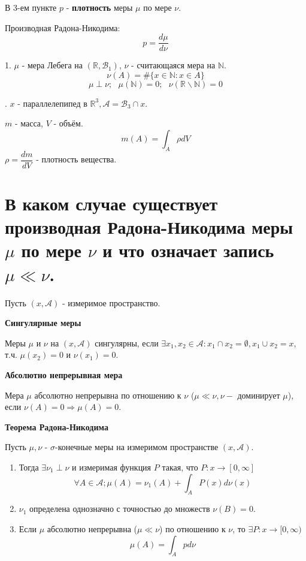 \begin{remark}
	В 3-ем пункте $p$ - \textbf{плотность} меры $\mu$ по мере $\nu$.
	
	Производная Радона-Никодима:
	\[ p = \frac{d \mu}{d \nu} \]
\end{remark}

\begin{exmp}
	1. $\mu$ - мера Лебега на $(\mathbb{R}, \mathcal{B}_1)$, $\nu$ - считающаяся мера на $\mathbb{N}$.
	\[ \nu (A) = \# \{ x \in \mathbb{N} : x \in A \} \]
	\[ \mu \perp \nu; ~~~ \mu (\mathbb{N}) = 0; ~~~ \nu (\mathbb{R} \backslash \mathbb{N}) = 0 \]
	
	. $x$ - параллелепипед в $\mathbb{R}^3, \mathcal{A} = \mathcal{B}_3 \cap x$.
	
	\noindent $m$ - масса, $V$ - объём.
	\[ m(A) = \int_A \rho dV \]
	\noindent $\rho = \dfrac{dm}{dV}$ - плотность вещества. 
\end{exmp}

\section{В каком случае существует производная Радона-Никодима меры $\mu$ по мере $\nu$ и что означает запись $\mu \ll \nu$.}

Пусть $(x, \mathcal{A})$ - измеримое пространство.

\noindent \textbf{Сингулярные меры}

Меры $\mu$ и $\nu$ на $(x, \mathcal{A})$ сингулярны, если $\exists x_1, x_2 \in \mathcal{A}: x_1 \cap x_2 = \emptyset, x_1 \cup x_2 = x$, т.ч. $\mu (x_2) = 0$ и $\nu (x_1) = 0$.

\noindent \textbf{Абсолютно непрерывная мера}

Мера $\mu$ абсолютно непрерывна по отношению к $\nu$ ($\mu \ll \nu, \nu - \text{ доминирует } \mu$), если $\nu(A) = 0 \Rightarrow \mu(A) = 0$.

\noindent \textbf{Теорема Радона-Никодима}

Пусть $\mu, \nu$ - $\sigma$-конечные меры на измеримом пространстве $(x, \mathcal{A})$.
\begin{enumerate}
	\item Тогда $\exists \nu_1 \perp \nu$ и измеримая функция $P$ такая, что $P: x \to [0, \infty]$
	\[  \forall A \in \mathcal{A}; \mu(A) = \nu_1 (A) + \int_A P (x) d \nu (x)  \]
	\item $\nu_1$ определена однозначно с точностью до множеств $\nu (B) = 0$.
	\item Если $\mu$ абсолютно непрерывна ($\mu \ll \nu$) по отношению к $\nu$, то $\exists P: x \to [0, \infty)$
	\[ \mu (A) = \int_A p d \nu \]
\end{enumerate}

